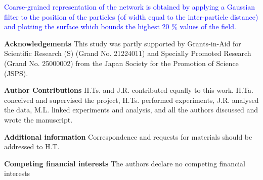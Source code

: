 \documentclass[preprint,amsmath,amssymb,superscriptaddress]{revtex4-1}
\begin{document}
\textcolor{blue}{Coarse-grained representation of the network is obtained by applying a Gaussian filter to the position of the particles (of width equal to the inter-particle distance) and plotting the surface which bounds the highest 20 \% values of the field.}





\bigskip
\noindent
{\bf Acknowledgements} 
This study was partly supported by Grants-in-Aid for Scientific Research (S) (Grand No. 21224011) and Specially Promoted Research (Grand No. 25000002) from the Japan Society for the Promotion of Science (JSPS). 

\medskip
\noindent
{\bf Author Contributions} 
H.Ts. and J.R. contributed equally to this work. 
H.Ta. conceived and supervised the project, H.Ts. performed experiments, J.R. analysed the data, M.L. linked experiments and analysis, and all the authors discussed and wrote the manuscript. 

\medskip
\noindent
{\bf Additional information} 
Correspondence and requests for materials should be addressed to H.T. 

\medskip
\noindent
{\bf Competing financial interests}
The authors declare no competing financial interests
\end{document}
